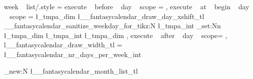 \tikzset
  {
    week ~ list/.style = 
      {
        execute ~ before ~ day ~ scope =
          {
              {
                  { 
                    \pgftransformyshift{-\pgf@y}
                  } 
              }
          }
        ,
        execute ~ at ~ begin ~ day ~ scope =
          {
            \pgfmathsetlength \l_tmpa_dim { \l__fantasycalendar_draw_day_xshift_tl}
            \__fantasycalendar_sanitize_weekday_for_tikz:N \l_tmpa_int
            \dim_set:Nn \l_tmpa_dim { \l_tmpa_int \l_tmpa_dim }
          }
        ,
        execute ~ after ~ day ~ scope=
          {
              {
              }
          }
        ,
        l__fantasycalendar_draw_width_tl = \l__fantasycalendar_nr_days_per_week_int
      }    
  }
    
    
    

%

\tl_new:N \l__fantasycalendar_month_list_tl

